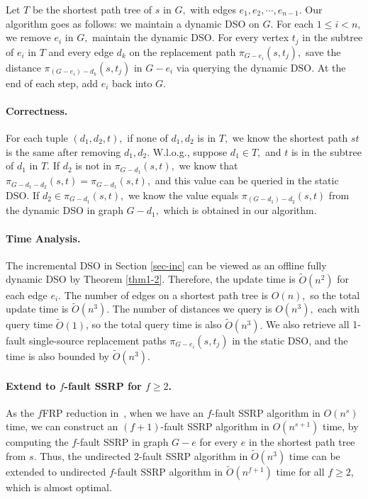 \documentclass[11pt]{article}
\theoremstyle{plain}
\theoremstyle{definition}
\newcommand{\too}[1]{\tilde{O}({#1})}
\newcommand{\og}[3]{\pi_{G-#3}\left(#1,#2\right)}
\begin{document}
Let $T$ be the shortest path tree of $s$ in $G,$ with edges $e_1,e_2,\cdots,e_{n-1}$. Our algorithm goes as follows: we maintain a dynamic DSO on $G.$ For each $1\le i<n,$ we remove $e_i$ in $G,$ maintain the dynamic DSO. For every vertex $t_j$ in the subtree of $e_i$ in $T$ and every edge $d_k$ on the replacement path $\og{s}{t_j}{e_i},$ save the distance $\pi_{(G-e_i)-d_k}(s,t_j)$ in $G-{e_i}$ via querying the dynamic DSO. At the end of each step, add $e_i$ back into $G.$

\paragraph{Correctness.}

For each tuple $(d_1,d_2,t),$ if none of $d_1,d_2$ is in $T,$ we know the shortest path $st$ is the same after removing $d_1,d_2.$ W.l.o.g., suppose $d_1\in T,$ and $t$ is in the subtree of $d_1$ in $T.$ If $d_2$ is not in $\og{s}{t}{d_1},$ we know that $\og{s}{t}{d_1-d_2}=\og{s}{t}{d_1},$ and this value can be queried in the static DSO. If $d_2\in \og{s}{t}{d_1},$ we know the value equals $\pi_{(G-d_1)-d_2}(s,t)$ from the dynamic DSO in graph $G-d_1,$ which is obtained in our algorithm.

\paragraph{Time Analysis.}

The incremental DSO in Section \ref{sec-inc} can be viewed as an offline fully dynamic DSO by Theorem \ref{thm1-2}. Therefore, the update time is $\too{n^2}$ for each edge $e_i.$ The number of edges on a shortest path tree is $O(n),$ so the total update time is $\too{n^3}.$ The number of distances we query is $O(n^3),$ each with query time $\too{1}$, so the total query time is also $\too{n^3}.$ We also retrieve all 1-fault single-source replacement paths $\og{s}{t_j}{e_i}$ in the static DSO, and the time is also bounded by $\too{n^3}.$

\paragraph{Extend to $f$-fault SSRP for $f\geq 2$.}

As the $f$FRP reduction in~\cite{WWX22}, when we have an $f$-fault SSRP algorithm in $O(n^s)$ time, we can construct an $(f+1)$-fault SSRP algorithm in $O(n^{s+1})$ time, by computing the $f$-fault SSRP in graph $G-e$ for every $e$ in the shortest path tree from $s$. Thus, the undirected 2-fault SSRP algorithm in $\tilde{O}(n^3)$ time can be extended to undirected $f$-fault SSRP algorithm in $\tilde{O}(n^{f+1})$ time for all $f\geq 2$, which is almost optimal. 





\vspace{5mm}


\end{document}
